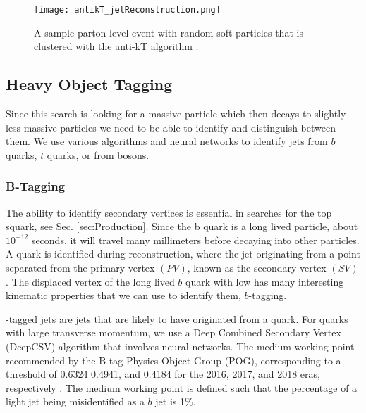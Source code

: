 \begin{figure}
 	\centering
	\texttt{[image: antikT\_jetReconstruction.png]}
 	\caption[Anti-$k_T$ Jet Reconstruction]{A sample parton level event with random soft particles that is clustered with the anti-kT algorithm \cite{cacciari_anti-ktjet_2008}.}
 	\label{antikTJetReco} 
\end{figure}

\subsection{Heavy Object Tagging}\label{HeavyObject}
Since this search is looking for a massive particle which then decays to slightly less massive particles we need to be able to identify and distinguish between them. We use various algorithms and neural networks to identify jets from $b$ quarks, $t$ quarks, or from \W {} bosons. 

\subsubsection{B-Tagging}\label{Btagging}
The ability to identify secondary vertices is essential in searches for the top squark, see Sec. \ref{sec:Production}. Since the b quark is a long lived particle, about $10^{-12}$ seconds, it will travel many millimeters before decaying into other particles. A \B{} quark is identified during reconstruction, where the jet originating from a point separated from the primary vertex $(PV)$, known as the secondary vertex $(SV)$. The displaced vertex of the long lived $b$ quark with low \pt{} has many interesting kinematic properties that we can use to identify them, $b$-tagging. 

\B-tagged jets are jets that are likely to have originated from a \B{} quark. For \B{} quarks with large transverse momentum, we use a Deep Combined Secondary Vertex (DeepCSV) algorithm that involves neural networks\cite{noauthor_performance_nodate}. The medium working point recommended by the B-tag Physics Object Group (POG), corresponding to a threshold of 0.6324 0.4941, and 0.4184 for the 2016, 2017, and 2018 eras, respectively \cite{noauthor_https://twiki.cern.ch/twiki/bin/viewauth/cms/btagrecommendation2016legacy_nodate, noauthor_https://twiki.cern.ch/twiki/bin/viewauth/cms/btagrecommendation94x_nodate, noauthor_https://twiki.cern.ch/twiki/bin/viewauth/cms/btagrecommendation102x_nodate, noauthor_https://twiki.cern.ch/twiki/bin/viewauth/cms/btagsfmethods_nodate}. The medium working point is defined such that the percentage of a light jet being misidentified as a $b$ jet is 1\%.

